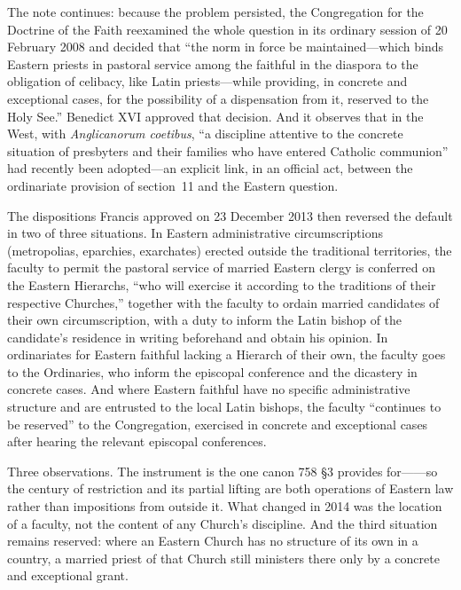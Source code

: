 The note continues: because the problem persisted, the Congregation for the Doctrine of the Faith reexamined the whole question in its ordinary session of 20 February 2008 and decided that ``the norm in force be maintained---which binds Eastern priests in pastoral service among the faithful in the diaspora to the obligation of celibacy, like Latin priests---while providing, in concrete and exceptional cases, for the possibility of a dispensation from it, reserved to the Holy See.'' Benedict XVI approved that decision. And it observes that in the West, with \emph{Anglicanorum coetibus}, ``a discipline attentive to the concrete situation of presbyters and their families who have entered Catholic communion'' had recently been adopted---an explicit link, in an official act, between the ordinariate provision of section~11 and the Eastern question.

The dispositions Francis approved on 23 December 2013 then reversed the default in two of three situations. In Eastern administrative circumscriptions (metropolias, eparchies, exarchates) erected outside the traditional territories, the faculty to permit the pastoral service of married Eastern clergy is conferred on the Eastern Hierarchs, ``who will exercise it according to the traditions of their respective Churches,'' together with the faculty to ordain married candidates of their own circumscription, with a duty to inform the Latin bishop of the candidate's residence in writing beforehand and obtain his opinion. In ordinariates for Eastern faithful lacking a Hierarch of their own, the faculty goes to the Ordinaries, who inform the episcopal conference and the dicastery in concrete cases. And where Eastern faithful have no specific administrative structure and are entrusted to the local Latin bishops, the faculty ``continues to be reserved'' to the Congregation, exercised in concrete and exceptional cases after hearing the relevant episcopal conferences.

Three observations. The instrument is the one canon 758 §3 provides for------so the century of restriction and its partial lifting are both operations of Eastern law rather than impositions from outside it. What changed in 2014 was the location of a faculty, not the content of any Church's discipline. And the third situation remains reserved: where an Eastern Church has no structure of its own in a country, a married priest of that Church still ministers there only by a concrete and exceptional grant.
